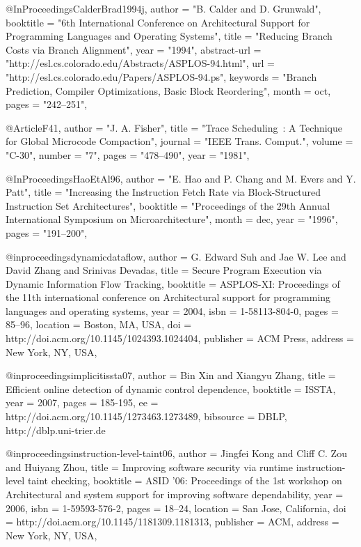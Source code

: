 @InProceedings{CalderBrad1994j,
  author =       "B. Calder and D. Grunwald",
  booktitle =    "6th International Conference on Architectural Support
                 for Programming Languages and Operating Systems",
  title =        "Reducing Branch Costs via Branch Alignment",
  year =         "1994",
  abstract-url = "http://esl.cs.colorado.edu/Abstracts/ASPLOS-94.html",
  url =          "http://esl.cs.colorado.edu/Papers/ASPLOS-94.ps",
  keywords =     "Branch Prediction, Compiler Optimizations, Basic Block
                 Reordering",
  month =        oct,
  pages =        "242--251",
}

@Article{F41,
  author =       "J. A. Fisher",
  title =        "Trace Scheduling~: {A} Technique for Global Microcode
                 Compaction",
  journal =      "IEEE Trans. Comput.",
  volume =       "C-30",
  number =       "7",
  pages =        "478--490",
  year =         "1981",
}

@InProceedings{HaoEtAl96,
  author =       "E. Hao and P. Chang and M. Evers and Y. Patt",
  title =        "Increasing the Instruction Fetch Rate via
                 Block-Structured Instruction Set Architectures",
  booktitle =    "Proceedings of the 29th Annual International Symposium
                 on Microarchitecture",
  month =        dec,
  year =         "1996",
  pages =        "191--200",
}

@inproceedings{dynamicdataflow,
 author = {G. Edward Suh and Jae W. Lee and David Zhang and Srinivas Devadas},
 title = {{Secure Program Execution via Dynamic Information Flow Tracking}},
 booktitle = {ASPLOS-XI: Proceedings of the 11th international conference on Architectural support for programming languages and operating systems},
 year = {2004},
 isbn = {1-58113-804-0},
 pages = {85--96},
 location = {Boston, MA, USA},
 doi = {http://doi.acm.org/10.1145/1024393.1024404},
 publisher = {ACM Press},
 address = {New York, NY, USA},
 }

@inproceedings{implicitissta07,
  author    = {Bin Xin and Xiangyu Zhang},
  title     = {Efficient online detection of dynamic control dependence},
  booktitle = {ISSTA},
  year      = {2007},
  pages     = {185-195},
  ee        = {http://doi.acm.org/10.1145/1273463.1273489},
  bibsource = {DBLP, http://dblp.uni-trier.de}
}

@inproceedings{instruction-level-taint06,
 author = {Jingfei Kong and Cliff C. Zou and Huiyang Zhou},
 title = {Improving software security via runtime instruction-level taint checking},
 booktitle = {ASID '06: Proceedings of the 1st workshop on Architectural and system support for improving software dependability},
 year = {2006},
 isbn = {1-59593-576-2},
 pages = {18--24},
 location = {San Jose, California},
 doi = {http://doi.acm.org/10.1145/1181309.1181313},
 publisher = {ACM},
 address = {New York, NY, USA},
 }

